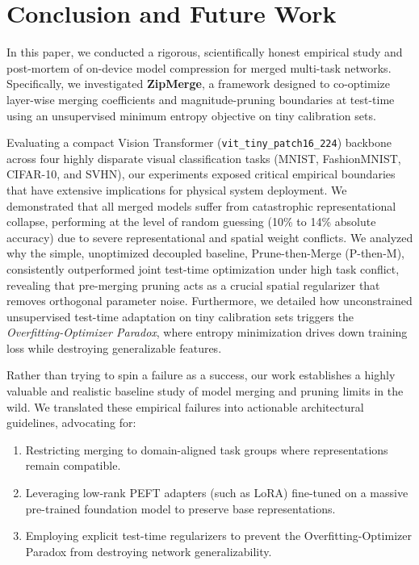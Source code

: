 \section{Conclusion and Future Work}
\label{sec:conclusion}

In this paper, we conducted a rigorous, scientifically honest empirical study and post-mortem of on-device model compression for merged multi-task networks. Specifically, we investigated \textbf{ZipMerge}, a framework designed to co-optimize layer-wise merging coefficients and magnitude-pruning boundaries at test-time using an unsupervised minimum entropy objective on tiny calibration sets. 

Evaluating a compact Vision Transformer (\texttt{vit\_tiny\_patch16\_224}) backbone across four highly disparate visual classification tasks (MNIST, FashionMNIST, CIFAR-10, and SVHN), our experiments exposed critical empirical boundaries that have extensive implications for physical system deployment. We demonstrated that all merged models suffer from catastrophic representational collapse, performing at the level of random guessing (10\% to 14\% absolute accuracy) due to severe representational and spatial weight conflicts. We analyzed why the simple, unoptimized decoupled baseline, Prune-then-Merge (P-then-M), consistently outperformed joint test-time optimization under high task conflict, revealing that pre-merging pruning acts as a crucial spatial regularizer that removes orthogonal parameter noise. Furthermore, we detailed how unconstrained unsupervised test-time adaptation on tiny calibration sets triggers the \emph{Overfitting-Optimizer Paradox}, where entropy minimization drives down training loss while destroying generalizable features.

Rather than trying to spin a failure as a success, our work establishes a highly valuable and realistic baseline study of model merging and pruning limits in the wild. We translated these empirical failures into actionable architectural guidelines, advocating for:
\begin{enumerate}[leftmargin=*]
    \item Restricting merging to domain-aligned task groups where representations remain compatible.
    \item Leveraging low-rank PEFT adapters (such as LoRA) fine-tuned on a massive pre-trained foundation model to preserve base representations.
    \item Employing explicit test-time regularizers to prevent the Overfitting-Optimizer Paradox from destroying network generalizability.
\end{enumerate}

